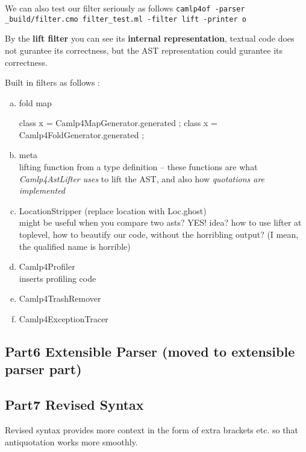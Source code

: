 We can also test our filter seriously as follows 
\verb|camlp4of -parser _build/filter.cmo filter_test.ml -filter lift -printer o |


By the \textbf{lift filter} you can see its \textbf{internal
  representation}, textual code does not gurantee its correctness, but
the AST representation could gurantee its correctness.


Built in filters as follows :
\begin{enumerate}[(a)]
\item fold map
  \begin{bluetext}
  class x = Camlp4MapGenerator.generated ;
  class x = Camlp4FoldGenerator.generated ;
  \end{bluetext}

\item meta \\ 
  lifting function from a type definition -- these functions are what
  \emph{Camlp4AstLifter uses} to lift the AST, and also how
  \emph{quotations are implemented  }
\item LocationStripper (replace location with Loc.ghost) \\
  might be useful when you compare two asts? YES!
  idea? how to use lifter at toplevel, how to beautify our code,
  without the horribling output? (I mean, the qualified name is horrible)
\item Camlp4Profiler \\
  inserts profiling code
\item Camlp4TrashRemover \\
\item Camlp4ExceptionTracer 
\end{enumerate}

\subsection{Part6 Extensible Parser (moved to extensible parser part)}

\subsection{Part7 Revised Syntax }
  Revised syntax provides more context in the form of extra brackets
  etc. so that antiquotation works more smoothly.
